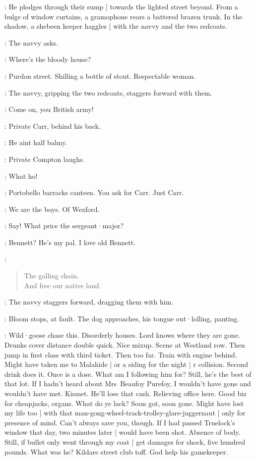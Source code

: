 :
He plodges through their sump |
towards the lighted street beyond.
From a bulge of window curtains,
a gramophone rears a battered brazen trunk.
In the shadow,
a shebeen keeper haggles |
with the navvy and the two redcoats.

:
The navvy asks.

\Navvy:
Where's the bloody house?

\ShebeenKeeper[1]:
Purdon street.
Shilling a bottle of stout.
Respectable woman.

:
The navvy,
gripping the two redcoats,
staggers forward with them.

\Navvy:
Come on,
you British army!

:
Private Carr,
behind his back.

\Carr:
He aint half balmy.

:
Private Compton laughs.

\Compton:
What ho!

\Carr:
Portobello barracks canteen.
You ask for Carr.
Just Carr.

\Navvy:
We are the boys.
Of Wexford.

\Compton:
Say!
What price the sergeant·major?

\Carr:
Bennett?
He's my pal.
I love old Bennett.

\Navvy:
\begin{verse}
%
    The galling chain.\\
    And free our native land.
\end{verse}

:
The navvy staggers forward,
dragging them with him.

:
Bloom stops,
at fault.
The dog approaches,
his tongue out·lolling,
panting.

\Bloom:
Wild·goose chase this.
Disorderly houses.
Lord knows where they are gone.
Drunks cover distance double quick.
Nice mixup.
Scene at Westland row.
Then jump in first class with third ticket.
Then too far.
Train with engine behind.
Might have taken me to Malahide |
or a siding for the night  |
r collision.
Second drink does it.
Once is a dose.
What am I following him for?
Still,
he's the best of that lot.
If I hadn't heard about Mrs~Beaufoy Purefoy,
I wouldn't have gone and wouldn't have met.
Kismet.
He'll lose that cash.
Relieving office here.
Good biz for cheapjacks,
organs.
What do ye lack?
Soon got,
soon gone.
Might have lost my life too |
with that man-gong-wheel-track-trolley-glare-juggernaut |
only for presence of mind.
Can't always save you,
though.
If I had passed Truelock's window that day,
two minutes later |
would have been shot.
Absence of body.
Still,
if bullet only went through my coat |
get damages for shock,
five hundred pounds.
What was he?
Kildare street club toff.
God help his gamekeeper.

